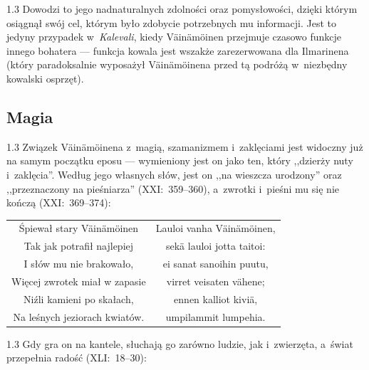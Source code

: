 \documentclass[11pt,a4paper,twoside]{report}
\begin{document}
\begin{spacing}{1.3}
Dowodzi to jego nadnaturalnych zdolności oraz pomysłowości, dzięki którym osiągnął swój cel, którym było zdobycie potrzebnych mu informacji. Jest to jedyny przypadek w~\emph{Kalevali}, kiedy Väinämöinen przejmuje czasowo funkcje innego bohatera --- funkcja kowala jest wszakże zarezerwowana dla Ilmarinena (który paradoksalnie wyposażył Väinämöinena przed tą podróżą w~niezbędny kowalski osprzęt).
\end{spacing}
\vspace*{0.5\baselineskip}
\subsection*{Magia}
\begin{spacing}{1.3}
Związek Väinämöinena z~magią, szamanizmem i~zaklęciami jest widoczny już na samym początku eposu --- wymieniony jest on jako ten, który ,,dzierży nuty i~zaklęcia''. Według jego własnych słów, jest on ,,na wieszcza urodzony'' oraz ,,przeznaczony na pieśniarza'' (XXI:~359--360), a~zwrotki i~pieśni mu się nie kończą (XXI:~369--374):
\end{spacing}
{\centering
\small
\begin{longtable}{c c}
Śpiewał stary Väinämöinen & Lauloi vanha Väinämöinen,\\
Tak jak potrafił najlepiej & sekä lauloi jotta taitoi:\\
I słów mu nie brakowało, & ei sanat sanoihin puutu,\\
Więcej zwrotek miał w zapasie & virret veisaten vähene;\\
Niźli kamieni po skałach, & ennen kalliot kiviä,\\
Na leśnych jeziorach kwiatów. & umpilammit lumpehia.\\
\end{longtable}
}
\begin{spacing}{1.3}
Gdy gra on na kantele, słuchają go zarówno ludzie, jak i~zwierzęta, a~świat przepełnia radość (XLI:~18--30):
\end{spacing}
\end{document}
